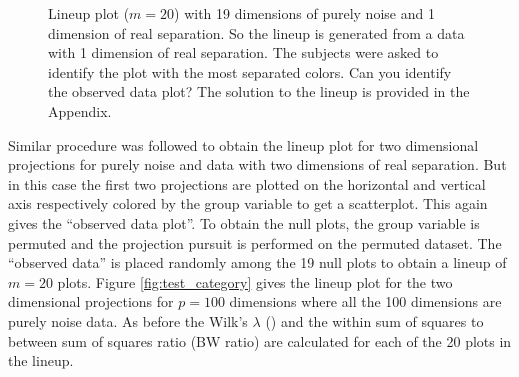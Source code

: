 \documentclass[12]{article}
\begin{document}
%
\begin{figure}[hbtp]
   \centering
       \caption{Lineup plot ($m=20$) with 19 dimensions of purely noise  and 1 dimension of real separation. So the lineup is generated from a data with 1 dimension of real separation. The subjects were asked to identify the plot with the most separated colors. Can you identify the observed data plot? The solution to the lineup is provided in the Appendix. }
     \label{fig:test_category_1d}
\end{figure}
%
%

Similar procedure was followed to obtain the lineup plot for two dimensional projections for purely noise and data with two dimensions of real separation. But in this case the first two projections are plotted on the horizontal and vertical axis respectively colored by the group variable to get a scatterplot. This again gives the ``observed data plot''. To obtain the null plots, the group variable is permuted and the projection pursuit is performed on the permuted dataset. The ``observed data'' is placed randomly among the 19 null plots to obtain a lineup of $m = 20$ plots. Figure \ref{fig:test_category} gives the lineup plot for the two dimensional projections for $p =100$ dimensions where all the 100 dimensions are purely noise data. As before the Wilk's $\lambda$ (\cite{JW02})  and the within sum of squares to between sum of squares ratio (BW ratio) are calculated for each of the 20 plots in the lineup. 
 
\end{document}
